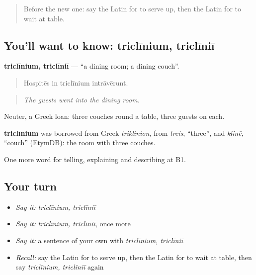 \label{lesson:LA-C356-triclinium}



\begin{quote}
Before the new one: say the Latin for to serve up, then the Latin for to wait at table.
\end{quote}

\subsection*{You'll want to know: triclīnium, triclīniī}
\textbf{triclīnium, triclīniī} — \textquotedblleft{}a dining room; a dining couch\textquotedblright{}.

\begin{quote}
Hospitēs in triclīnium intrāvērunt.
\end{quote}

\begin{quote}
\emph{The guests went into the dining room.}
\end{quote}

Neuter, a Greek loan: three couches round a table, three guests on each.

\begin{cousinweb}
\textbf{triclīnium} was borrowed from Greek \emph{triklinion}, from \emph{treis}, \textquotedblleft{}three\textquotedblright{}, and \emph{klinē}, \textquotedblleft{}couch\textquotedblright{} (EtymDB): the room with three couches.
\end{cousinweb}

\begin{grammarlens}[title={What you've built}]
One more word for telling, explaining and describing at B1.
\end{grammarlens}

\subsection*{Your turn}
\begin{itemize}
\raggedright
  \item \emph{Say it:} \emph{triclīnium, triclīniī}
  \item \emph{Say it:} \emph{triclīnium, triclīniī}, once more
  \item \emph{Say it:} a sentence of your own with \emph{triclīnium, triclīniī}
  \item \emph{Recall:} say the Latin for to serve up, then the Latin for to wait at table, then say \emph{triclīnium, triclīniī} again
\end{itemize}

